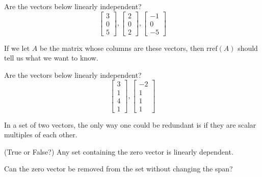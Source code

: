 \documentclass{ximera}
\begin{document}
\begin{problem}\label{prob:linindmultchoice3}
 Are the vectors below linearly independent?
$$\begin{bmatrix}3\\0\\5\end{bmatrix}, \begin{bmatrix}2\\0\\2\end{bmatrix},\begin{bmatrix}-1\\0\\-5\end{bmatrix}$$

\begin{multipleChoice}
 \end{multipleChoice}
 \begin{hint}
 If we let $A$ be the matrix whose columns are these vectors, then $\mbox{rref}(A)$ should tell us what we want to know.
 \end{hint}
\end{problem}

\begin{problem}\label{prob:linindmultchoice4}
 Are the vectors below linearly independent?
$$\begin{bmatrix}3\\1\\4\\1\end{bmatrix}, \begin{bmatrix}-2\\1\\1\\1\end{bmatrix}$$

\begin{multipleChoice}
 \end{multipleChoice}
 \begin{hint}
 In a set of two vectors, the only way one could be redundant is if they are scalar multiples of each other.
 \end{hint}

\end{problem}

\begin{problem}\label{prob:TFlinind1}
(True or False?) Any set containing the zero vector is linearly dependent.
\begin{multipleChoice}
 \end{multipleChoice}
  \begin{hint}
 Can the zero vector be removed from the set without changing the span?
 \end{hint}
 \end{problem}
 
\end{document}
